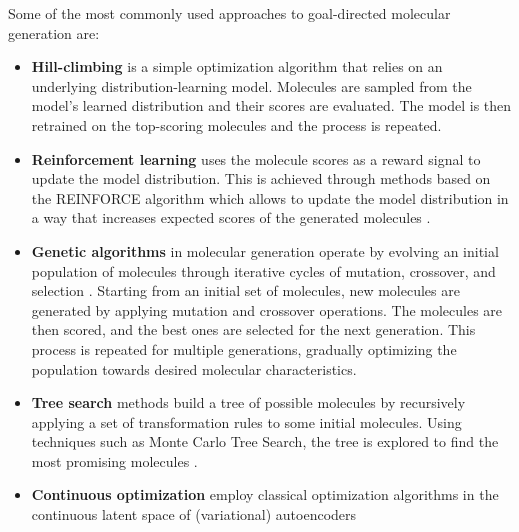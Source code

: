 Some of the most commonly used approaches to goal-directed molecular generation are:
\begin{itemize}
      \item \textbf{Hill-climbing}
            \citep{seglerGeneratingFocusedMolecule2018,xieMARSMarkovMolecular2021,thomasAugmentedHillClimbIncreases2022}
            is a simple optimization algorithm that relies on an underlying distribution-learning model.
            Molecules are sampled from the model's learned distribution and their scores are evaluated.
            The model is then retrained on the top-scoring molecules and the process is repeated.
      \item \textbf{Reinforcement learning} uses the molecule scores as a reward signal to update
            the model distribution. This is achieved through methods based on the REINFORCE algorithm
            \citep{williamsSimpleStatisticalGradientfollowing1992} which allows to update the model
            distribution in a way that increases expected scores of the generated molecules
            \citep{olivecronaMolecularDenovoDesign2017,thomasAugmentedHillClimbIncreases2022,youGraphConvolutionalPolicy2019,guoAugmentedMemoryCapitalizing2023}.
      \item \textbf{Genetic algorithms} in molecular generation operate by evolving an initial
            population of molecules through iterative cycles of mutation, crossover, and selection \citep{jensenGraphbasedGeneticAlgorithm2019,nigamGenerativeModelsSuperfast2021,yoshikawaPopulationbasedNovoMolecule2018}.
            Starting from an initial set of molecules, new molecules are generated by applying
            mutation and crossover operations. The molecules are then scored, and the best ones are
            selected for the next generation. This process is repeated for multiple generations,
            gradually optimizing the population towards desired molecular characteristics.
      \item \textbf{Tree search} methods build a tree of possible molecules by recursively applying a set of transformation rules
            to some initial molecules. Using techniques such as Monte Carlo Tree Search, the tree is
            explored to find the most promising molecules \citep{yangChemTSEfficientPython2017,jensenGraphbasedGeneticAlgorithm2019}.
      \item \textbf{Continuous optimization} employ classical optimization algorithms in the continuous
            latent space of (variational) autoencoders
            \citep{gomez-bombarelliAutomaticChemicalDesign2018,kusnerGrammarVariationalAutoencoder2017,winterEfficientMultiobjectiveMolecular2019}

\end{itemize}
